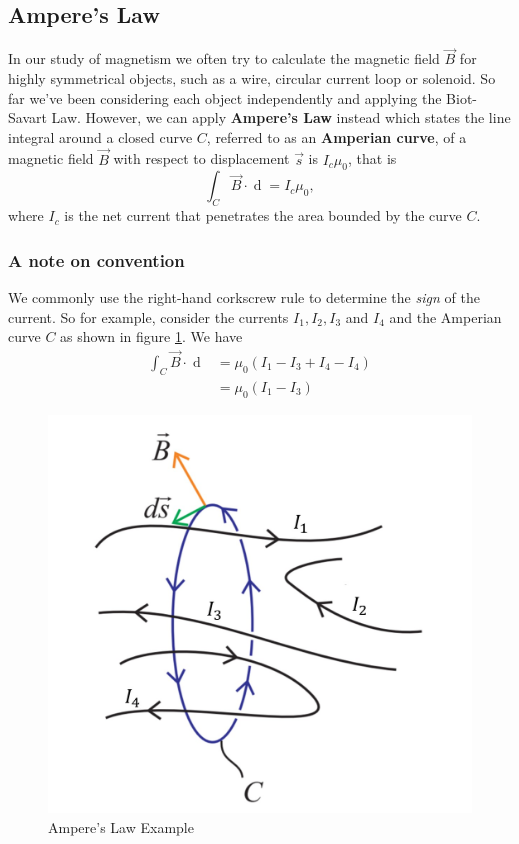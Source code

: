 \subsection{Ampere's Law}

In our study of magnetism we often try to calculate the magnetic field $\vec{B}$ for highly symmetrical objects, such as a wire, circular current loop or solenoid. So far we've been considering each object independently and applying the Biot-Savart Law. However, we can apply \textbf{Ampere's Law} instead which states the line integral around a closed curve $C$, referred to as an \textbf{Amperian curve}, of a magnetic field $\vec{B}$ with respect to displacement $\vec{s}$ is $I_c \mu_0$, that is
\begin{equation}
    \int_C \vec{B} \cdot \mathop{\mathrm{d}\vec{s}} = I_c \mu_0,
\end{equation}
where $I_c$ is the net current that penetrates the area bounded by the curve $C$. 
\subsubsection*{A note on convention} 
We commonly use the right-hand corkscrew rule to determine the \textit{sign} of the current. So for example, consider the currents $I_1, I_2, I_3$ and $I_4$ and the Amperian curve $C$ as shown in figure \ref{fig:ampere-law-1}. We have
\begin{align}
    \int_C \vec{B} \cdot \mathop{\mathrm{d}\vec{s}} &= \mu_0 (I_1 - I_3 + I_4 - I_4) \\
    &= \mu_0 (I_1 - I_3)
\end{align}

\begin{figure}[h!]
    \centering
    \includegraphics[scale=0.4]{notes/images/Ampere-Law-1.JPG}
    \caption{Ampere's Law Example}
    \label{fig:ampere-law-1}
\end{figure}
\FloatBarrier

